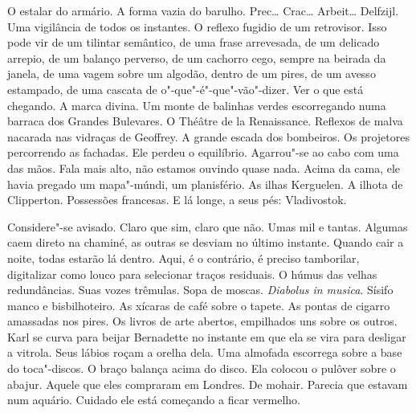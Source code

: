 O estalar do armário. A forma vazia do barulho. Prec\ldots{} Crac\ldots{}
Arbeit\ldots{} Delfzijl. Uma vigilância de todos os instantes. O reflexo
fugidio de um retrovisor. Isso pode vir de um tilintar semântico, de uma
frase arrevesada, de um delicado arrepio, de um balanço perverso, de um
cachorro cego, sempre na beirada da janela, de uma vagem sobre um
algodão, dentro de um pires, de um avesso estampado, de uma cascata de
o"-que"-é"-que"-vão"-dizer. Ver o que está chegando. A marca divina. Um monte
de balinhas verdes escorregando numa barraca dos Grandes Bulevares. O
Théâtre de la Renaissance. Reflexos de malva nacarada nas vidraças de
Geoffrey. A grande escada dos bombeiros. Os projetores percorrendo as
fachadas. Ele perdeu o equilíbrio. Agarrou"-se ao cabo com uma das mãos.
Fala mais alto, não estamos ouvindo quase nada. Acima da cama, ele havia
pregado um mapa"-múndi, um planisfério. As ilhas Kerguelen. A ilhota de
Clipperton. Possessões francesas. E lá longe, a seus pés: Vladivostok.

Considere"-se avisado. Claro que sim, claro que não. Umas mil e tantas.
Algumas caem direto na chaminé, as outras se desviam no último instante.
Quando cair a noite, todas estarão lá dentro. Aqui, é o contrário, é
preciso tamborilar, digitalizar como louco para selecionar traços
residuais. O húmus das velhas redundâncias. Suas vozes trêmulas. Sopa de
moscas. \emph{Diabolus in musica}. Sísifo manco e bisbilhoteiro. As
xícaras de café sobre o tapete. As pontas de cigarro amassadas nos
pires. Os livros de arte abertos, empilhados uns sobre os outros. Karl
se curva para beijar Bernadette no instante em que ela se vira para
desligar a vitrola. Seus lábios roçam a orelha dela. Uma almofada
escorrega sobre a base do toca"-discos. O braço balança acima do disco.
Ela colocou o pulôver sobre o abajur. Aquele que eles compraram em
Londres. De mohair. Parecia que estavam num aquário. Cuidado ele está
começando a ficar vermelho.

